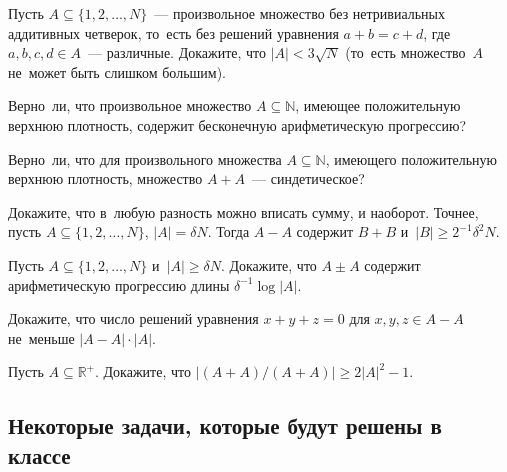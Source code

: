 \begin{problems}
\item
Пусть $A \subseteq \{ 1, 2, \ldots, N \}$~--- произвольное множество без
нетривиальных аддитивных четверок, то~есть без решений уравнения
$a + b = c + d$, где $a, b, c, d \in A$~--- различные.
Докажите, что $|A| < 3 \sqrt{N}$ (то~есть множество~$A$ не~может быть слишком
большим).

\item
Верно~ли, что произвольное множество $A \subseteq \mathbb{N}$, имеющее
положительную верхнюю плотность, содержит бесконечную арифметическую
прогрессию?

\item
Верно~ли, что для произвольного множества $A \subseteq \mathbb{N}$, имеющего
положительную верхнюю плотность, множество $A + A$~--- синдетическое?

\item
Докажите, что в~любую разность можно вписать сумму, и наоборот.
Точнее, пусть $A \subseteq \{ 1, 2, \ldots, N \}$, $|A| = \delta N$.
Тогда $A - A$ содержит $B + B$ и~$|B| \geq 2^{-1} \delta^2 N$.

\item
Пусть $A \subseteq \{ 1, 2, \ldots, N \}$ и~$|A| \geq \delta N$.
Докажите, что $A \pm A$ содержит арифметическую прогрессию длины
$\delta^{-1} \log |A|$.

\item
Докажите, что число решений уравнения $x + y + z = 0$ для $x, y, z \in A - A$
не~меньше $|A - A| \cdot |A|$.

\item
Пусть $A \subseteq \mathbb{R}^{+}$.
Докажите, что $|(A + A) / (A + A)| \geq 2 |A|^2 - 1$.

\end{problems}


\subsection*{Некоторые задачи, которые будут решены в классе}
\resetproblem

